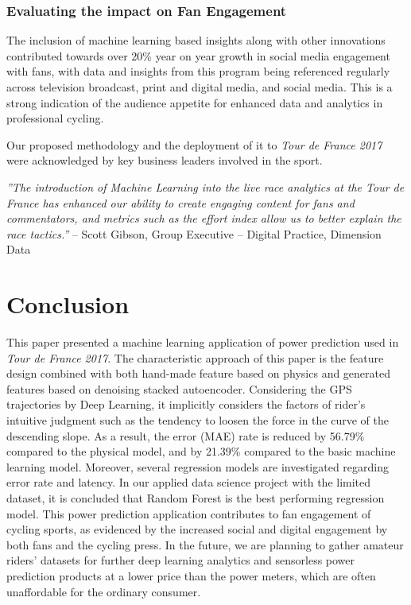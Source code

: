 \documentclass[runningheads]{llncs}
\begin{document}
\subsubsection{Evaluating the impact on Fan Engagement}
The inclusion of machine learning based insights along with other innovations contributed towards over 20\% year on year growth in social media engagement with fans, with data and insights from this program being referenced regularly across television broadcast, print and digital media, and social media. This is a strong indication of the audience appetite for enhanced data and analytics in professional cycling.

Our proposed methodology and the deployment of it to {\it{Tour de France 2017}} were acknowledged by key business leaders involved in the sport.

{\it{''The introduction of Machine Learning into the live race analytics at the Tour de France has enhanced our ability to create engaging content for fans and commentators, and metrics such as the effort index allow us to better explain the race tactics.''}} – Scott Gibson, Group Executive – Digital Practice, Dimension Data

\section{Conclusion}
This paper presented a machine learning application of power prediction used in {\it{Tour de France 2017}}. The characteristic approach of this paper is the feature design combined with both hand-made feature based on physics and generated features based on denoising stacked autoencoder. Considering the GPS trajectories by Deep Learning, it implicitly considers the factors of rider's intuitive judgment such as the tendency to loosen the force in the curve of the descending slope. As a result, the error (MAE) rate is reduced by 56.79\% compared to the physical model, and by 21.39\% compared to the basic machine learning model. Moreover, several regression models are investigated regarding error rate and latency. In our applied data science project with the limited dataset, it is concluded that Random Forest is the best performing regression model. This power prediction application contributes to fan engagement of cycling sports, as evidenced by the increased social and digital engagement by both fans and the cycling press.  In the future, we are planning to gather amateur riders' datasets for further deep learning analytics and sensorless power prediction products at a lower price than the power meters, which are often unaffordable for the ordinary consumer.
\end{document}
